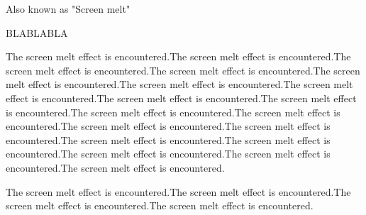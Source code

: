 Also known as "Screen melt"
\par BLABLABLA
\par
The screen melt effect is encountered.The screen melt effect is encountered.The screen melt effect is encountered.The screen melt effect is encountered.The screen melt effect is encountered.The screen melt effect is encountered.The screen melt effect is encountered.The screen melt effect is encountered.The screen melt effect is encountered.The screen melt effect is encountered.The screen melt effect is encountered.The screen melt effect is encountered.The screen melt effect is encountered.The screen melt effect is encountered.The screen melt effect is encountered.The screen melt effect is encountered.The screen melt effect is encountered.The screen melt effect is encountered.\\
\par
The screen melt effect is encountered.The screen melt effect is encountered.The screen melt effect is encountered.The screen melt effect is encountered.\\
\par
{}\\
\\
\\
\\